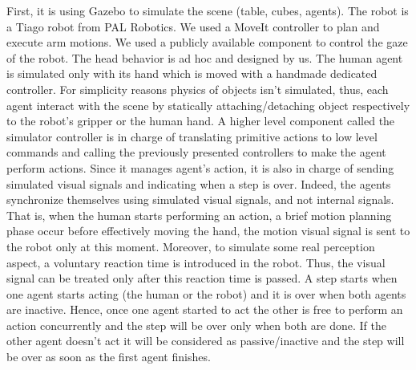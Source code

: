 First, it is using Gazebo to simulate the scene (table, cubes, agents). 
The robot is a Tiago robot from PAL Robotics. We used a MoveIt controller to plan and execute arm motions. We used a publicly available component to control the gaze of the robot. The head behavior is ad hoc and designed by us.
The human agent is simulated only with its hand which is moved with a handmade dedicated controller. 
For simplicity reasons physics of objects isn't simulated, thus, each agent interact with the scene by statically attaching/detaching object respectively to the robot's gripper or the human hand.
A higher level component called the simulator controller is in charge of translating primitive actions to low level commands and calling the previously presented controllers to make the agent perform actions. Since it manages agent's action, it is also in charge of sending simulated visual signals and indicating when a step is over. Indeed, the agents synchronize themselves using simulated visual signals, and not internal signals. That is, when the human starts performing an action, a brief motion planning phase occur before effectively moving the hand, the motion visual signal is sent to the robot only at this moment. Moreover, to simulate some real perception aspect, a voluntary reaction time is introduced in the robot. Thus, the visual signal can be treated only after this reaction time is passed. A step starts when one agent starts acting (the human or the robot) and it is over when both agents are inactive. Hence, once one agent started to act the other is free to perform an action concurrently and the step will be over only when both are done. If the other agent doesn't act it will be considered as passive/inactive and the step will be over as soon as the first agent finishes.

